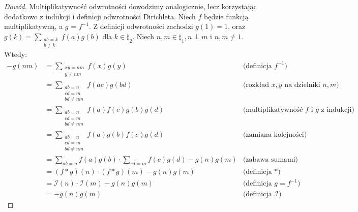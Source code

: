 \begin{proof}[Dowód]
	Multiplikatywność odwrotności dowodzimy analogicznie, lecz korzystając
	dodatkowo z indukcji i definicji odwrotności Dirichleta.
	Niech $f$ będzie funkcją multiplikatywną, a $g$ = $f^{-1}$. Z definicji odwrotności zachodzi $g(1) = 1$,
	oraz $g(k) = \sum_{\substack{ab = k \\ b \neq k}} f(a)g(b)$ dla $k \in \natural_2$.
	Niech $n, m \in \natural_1, n \perp m$ i $n, m \neq 1$. Wtedy:
	\begin{align*}
		-g(nm) & = \sum_{                                                                                                                         \substack{xy = nm                                   \\ y \neq nm}} f(x)g(y)                             & \text{(definicja $f^{-1}$)}                                   \\
		       & = \sum_{                                                                                                                         \substack{ab = n                                    \\ cd = m \\ bd \neq nm}} f(ac)g(bd)                   & \text{(rozkład $x, y$ na dzielniki $n, m$)}                   \\
		       & = \sum_{                                                                                                                         \substack{ab = n                                    \\ cd = m \\ bd \neq nm}} f(a)f(c)g(b)g(d)             & \text{(multiplikatywność $f$ i $g$ z indukcji)}               \\
		       & = \sum_{                                                                                                                         \substack{ab = n                                    \\ cd = m \\ bd \neq nm}} f(a)g(b)f(c)g(d)             & \text{(zamiana kolejności)}                                   \\
		       & = \sum_{ab = n} f(a)g(b) \cdot \sum_{cd = m} f(c)g(d) - g(n)g(m)                                                                                   & \text{(zabawa sumami)}          \\
		       & = (f*g)(n) \cdot (f*g)(m) - g(n)g(m)                                                                                                               & \text{(definicja $*$)}          \\
		       & = \mathcal I(n) \cdot \mathcal I(m) - g(n)g(m)                                                                                                     & \text{(definicja $g = f^{-1}$)} \\
		       & = -g(n)g(m)                                                                                                                                        & \text{(definicja $\mathcal I$)}
	\end{align*}
\end{proof}


